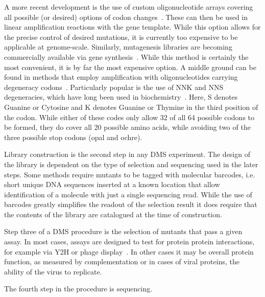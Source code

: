 A more recent development is the use of custom oligonucleotide arrays covering all possible (or desired) options of codon changes~\cite{kitzman_massively_2015}. These can then be used in linear amplification reactions with the gene template. While this option allows for the precise control of desired mutations, it is currently too expensive to be applicable at genome-scale. Similarly, mutagenesis libraries are becoming commercially available via gene synthesis~\cite{kosuri_scalable_2010}. While this method is certainly the most convenient, it is by far the most expensive option. A middle ground can be found in methods that employ amplification with oligonucleotides carrying degeneracy codons~\cite{pal_methods_2005}. Particularly popular is the use of NNK and NNS degeneracies, which have long been used in biochemistry~\cite{scott_searching_1990,barbas_semisynthetic_1992}. Here, S denotes Guanine or Cytosine and K denotes Guanine or Thymine in the third position of the codon. While either of these codes only allow 32 of all 64 possible codons to be formed, they do cover all 20 possible amino acids, while avoiding two of the three possible stop codons (opal and ochre).

Library construction is the second step in any DMS experiment. 
The design of the library is dependent on the type of selection and sequencing used in the later steps. Some methods require mutants to be tagged with molecular barcodes, i.e. short unique DNA sequences inserted at a known location that allow identification of a molecule with just a single sequencing read. While the use of barcodes greatly simplifies the readout of the selection result it does require that the contents of the library are catalogued at the time of construction.

Step three of a DMS procedure is the selection of mutants that pass a given assay. In most cases, assays are designed to test for protein protein interactions, for example via Y2H or phage display~. In other cases it may be overall protein function, as measured by complementation or in cases of viral proteins, the ability of the virus to replicate.

The fourth step in the procedure is sequencing. 


